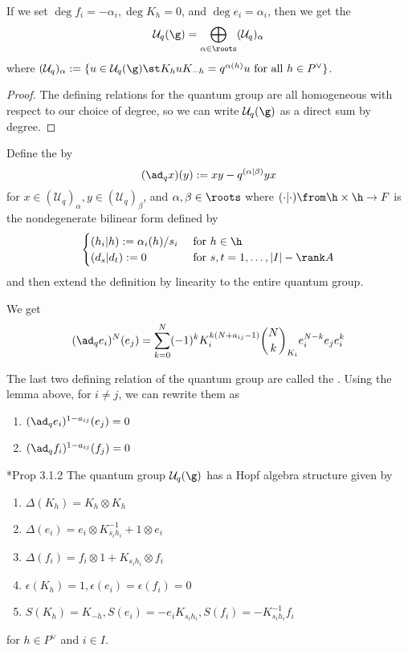 \documentclass[11pt,leqno,oneside]{amsart}
\numberwithin{thm}{section}
\newcommand{\weightlattice}{P}
\newcommand{\U}{\mathcal{U}}
\newcommand{\qbinom}[3][q]{\binom{#2}{#3}_{#1}}
\begin{document}
\begin{prop}\label{root-space-decomp}
  If we set \(\deg f_i = -\alpha_i, \deg K_h = 0\), and \(\deg e_i =
  \alpha_i\), then we get the  \[
    \U_q(\g) = \bigoplus_{\alpha \in \roots} (\U_q)_{\alpha}
  \]
  where \((\U_q)_\alpha := \{u \in \U_q(\g) \st K_h u K_{-h} =
  q^{\alpha(h)}u \text{ for all } h \in \weightlattice^\vee\}\).
\end{prop}
\begin{proof}
  The defining relations for the quantum group are all homogeneous
  with respect to our choice of degree, so we can write \(\U_q(\g)\)
  as a direct sum by degree.
\end{proof}
\begin{defn}
  Define the  by \[
    (\ad_q x)(y) := xy - q^{(\alpha | \beta)}yx
  \]
  for \(x \in (\U_q)_\alpha, y \in (\U_q)_\beta\), and \(\alpha,\beta
  \in \roots\) where \((\cdot | \cdot) \from \h \times \h \to F\) is
  the nondegenerate bilinear form
  defined by \[
    \begin{cases}
      (h_i | h) := \alpha_i(h)/s_i & \text{ for }h\in \h\\
      (d_s | d_t) := 0 & \text{ for }s,t = 1,\ldots,|I|-\rank A
    \end{cases}
  \]
  and then extend the definition by linearity to the entire quantum group. 
\end{defn}
\begin{lem}
  We get \[
    (\ad_q e_i)^N(e_j) = \sum_{k=0}^N (-1)^k K_i^{k(N+a_{ij}-1)}
    \qbinom[K_i]{N}{k} e_i^{N-k} e_j e_i^k
  \]
\end{lem}
\begin{rmk}
  The last two defining relation of the quantum group are called the
  . Using the lemma above, for \(i \neq
  j\), we can rewrite
  them as
  \begin{enumerate}
  \item \((\ad_q e_i)^{1-a_{ij}}(e_j) = 0\)
  \item \((\ad_q f_i)^{1-a_{ij}}(f_j) = 0\)
  \end{enumerate}
\end{rmk}
\begin{prop}
  \cite{hong-kang}*{Prop 3.1.2} The quantum group \(\U_q(\g)\) has a
  Hopf algebra structure given by
  \begin{enumerate}
  \item \(\Delta(K_h) = K_h \otimes K_h\)
  \item \(\Delta(e_i) = e_i \otimes K_{s_i h_i}^{-1} + 1 \otimes e_i\)
  \item \(\Delta(f_i) = f_i \otimes 1 + K_{s_i h_i} \otimes f_i\)
  \item \(\epsilon(K_h) = 1, \epsilon(e_i) = \epsilon(f_i) = 0\)
  \item \(S(K_h) = K_{-h}, S(e_i) = - e_i K_{s_i h_i}, S(f_i) = -
    K_{s_i h_i}^{-1} f_i\)
  \end{enumerate}
  for \(h \in \weightlattice^\vee\) and \(i \in I\).
\end{prop}
\end{document}
